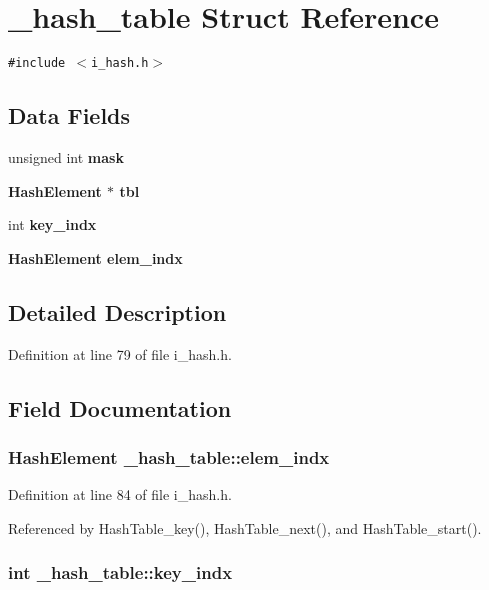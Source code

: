 \section{\_\-hash\_\-table Struct Reference}
\label{struct__hash__table}
{\tt \#include $<$i\_\-hash.h$>$}

\subsection*{Data Fields}
\begin{CompactItemize}
\item 
unsigned int \bf{mask}
\item 
\bf{Hash\-Element} $\ast$ \bf{tbl}
\item 
int \bf{key\_\-indx}
\item 
\bf{Hash\-Element} \bf{elem\_\-indx}
\end{CompactItemize}


\subsection{Detailed Description}




Definition at line 79 of file i\_\-hash.h.

\subsection{Field Documentation}
\subsubsection{\setlength{\rightskip}{0pt plus 5cm}\bf{Hash\-Element} \bf{\_\-hash\_\-table::elem\_\-indx}}\label{struct__hash__table_9e78193a292e5116581539e94475c8c5}




Definition at line 84 of file i\_\-hash.h.

Referenced by Hash\-Table\_\-key(), Hash\-Table\_\-next(), and Hash\-Table\_\-start().
\subsubsection{\setlength{\rightskip}{0pt plus 5cm}int \bf{\_\-hash\_\-table::key\_\-indx}}\label{struct__hash__table_00a84184d98a793794750cae1569a541}




